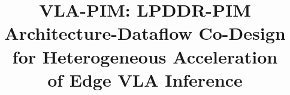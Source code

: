 \documentclass[conference]{IEEEtran}
\providecommand{\texorpdfstring}[2]{#1}
\begin{document}
\title{VLA-PIM: LPDDR-PIM Architecture-Dataflow Co-Design for Heterogeneous Acceleration \texorpdfstring{\\}{ } of Edge VLA Inference}
\author{}
\maketitle

\begin{abstract}

\end{abstract}


\FloatBarrier

\FloatBarrier

\FloatBarrier




\end{document}
